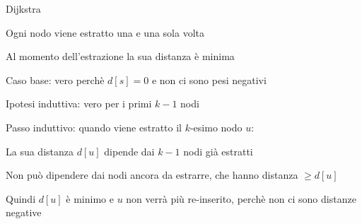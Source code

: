 \begin{frame}{Dijkstra}

\vspace{-9pt}
\begin{myboxtitle}
\BIL 
\item Ogni nodo viene estratto una e una sola volta
\item Al momento dell'estrazione la sua distanza è minima    
\EIL
\end{myboxtitle}


\BIL
\item Caso base: vero perchè $d[s]=0$ e non ci sono pesi negativi
\item Ipotesi induttiva: vero per i primi $k-1$ nodi
\item Passo induttivo: quando viene estratto il $k$-esimo nodo $u$:
  \BI
  \item La sua distanza $d[u]$ dipende dai $k-1$ nodi già estratti
  \item Non può dipendere dai nodi ancora da estrarre, che hanno distanza $\geq d[u]$
  \item Quindi $d[u]$ è minimo e $u$ non verrà più re-inserito, perchè non ci sono distanze negative
\EI
\EIL

\end{frame}


